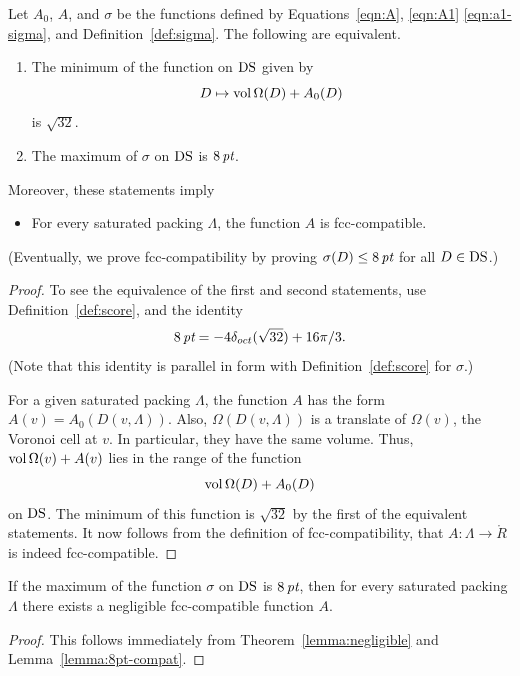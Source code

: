 \begin{lemma}\label{lemma:8pt-compat}
Let $A_0$, $A$, and $\sigma$ be the functions defined by
Equations~\ref{eqn:A}, \ref{eqn:A1}  \ref{eqn:a1-sigma}, and
Definition~\ref{def:sigma}. The following are equivalent.
\begin{enumerate}
  \item The minimum of the function on ${\operatorname{DS}}$ given by
      $$D\mapsto {\operatorname{vol}}\,\Omega(D) + A_0(D)$$
is $\sqrt{32}$.
  \item The maximum of $\sigma$ on ${\operatorname{DS}}$ is $8\,\hbox{\it pt}$.
\end{enumerate}
Moreover, these statements imply
\begin{itemize}
  \item For every saturated packing $\Lambda$,
  the function $A$ is
  fcc-compatible.
\end{itemize}
\end{lemma}

(Eventually, we prove fcc-compatibility by proving
$\sigma(D)\le8\,\hbox{\it pt}$ for all $D\in{\operatorname{DS}}$.)

\begin{proof} To see the equivalence of the first and second statements,
use Definition~\ref{def:score},  and the identity
   $$8\,\hbox{\it pt} = -4\delta_{oct} (\sqrt{32}) + 16 \pi/3.$$
(Note that this identity is parallel in form with
Definition~\ref{def:score} for $\sigma$.)

For a given saturated packing $\Lambda$, the function $A$ has the
form $A(v) = A_0(D(v,\Lambda))$.  Also, $\Omega(D(v,\Lambda))$ is
a translate of $\Omega(v)$, the Voronoi cell at $v$.  In
particular, they have the same volume.  Thus,
${\operatorname{vol}}\,\Omega(v)+A(v)$ lies in the range of the function
   $${\operatorname{vol}}\,\Omega(D) + A_0(D)$$
on ${\operatorname{DS}}$.  The minimum of this function is $\sqrt{32}$ by the
first of the equivalent statements.  It now follows from the
definition of fcc-compatibility, that $A:\Lambda\to\ring{R}$ is
indeed fcc-compatible.
\end{proof}

\begin{theorem}\label{lemma:exista}
If the maximum of the function $\sigma$ on
${\operatorname{DS}}$ is $8\,\hbox{\it pt}$, then for every saturated packing $\Lambda$
there exists a negligible fcc-compatible function $A$.
\end{theorem}

\begin{proof} This follows immediately from Theorem~\ref{lemma:negligible}
and Lemma~\ref{lemma:8pt-compat}.
\end{proof}



